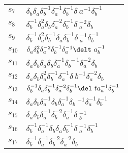 \documentclass{article}
\begin{document}
\begin{center}
\begin{tabular}{ll}
$s_{7}$ & $\delta_b^{}\delta_a^{}\delta_b^{-1}\delta_a^{-1}\delta_b^{-1}\delta_\
a^{-1}\delta_b^{-1}$ \\
$s_{8}$ & $\delta_b^{-1}\delta_a^{2}\delta_b^{}\delta_a^{-2}\delta_b^{-1}\delta\
_a^{-2}\delta_b^{}$ \\
$s_{9}$ & $\delta_b^{-1}\delta_a^{2}\delta_b^{-1}\delta_a^{}\delta_b^{-1}\delta\
_a^{-1}\delta_b^{-1}$ \\
$s_{10}$ & $\delta_a^{}\delta_b^{2}\delta_a^{-2}\delta_b^{-1}\delta_a^{-1}\delt\
a_b^{-1}$ \\
$s_{11}$ & $\delta_a^{}\delta_b^{}\delta_a^{}\delta_b^{}\delta_a^{-1}\delta_b^{\
-1}\delta_a^{-2}\delta_b^{}$ \\
$s_{12}$ & $\delta_a^{}\delta_b^{}\delta_a^{2}\delta_b^{-1}\delta_a^{-1}\delta_\
b^{-1}\delta_a^{-2}\delta_b^{}$ \\
$s_{13}$ & $\delta_b^{-1}\delta_a^{}\delta_b^{-1}\delta_a^{-2}\delta_b^{-1}\del\
ta_a^{-1}\delta_b^{-1}$ \\
$s_{14}$ & $\delta_a^{}\delta_b^{}\delta_a^{-1}\delta_b^{}\delta_a^{-1}\delta_b\
^{-1}\delta_a^{-1}\delta_b^{-1}$ \\
$s_{15}$ & $\delta_a^{}\delta_b^{}\delta_a^{-1}\delta_b^{-2}\delta_a^{-1}\delta\
_b^{-1}$ \\
$s_{16}$ & $\delta_b^{-1}\delta_a^{-1}\delta_b^{}\delta_a^{}\delta_b^{-1}\delta\
_a^{-1}\delta_b^{-1}$ \\
$s_{17}$ & $\delta_b^{-1}\delta_a^{-1}\delta_b^{-2}\delta_a^{-2}\delta_b^{}$ \\
\bottomrule
\end{tabular}
\end{center}

\thispagestyle{empty}
\end{document}
